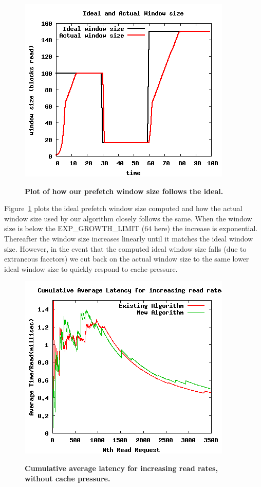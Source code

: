 \documentclass[twocolumn,10pt]{article}
\begin{document}
\begin{figure}[t!!]
\centering \resizebox{!}{2.8in}
{\includegraphics{window-size-pattern.png}}
\caption{\small \bf Plot of how our prefetch window size follows the ideal.}
\label{fig:window-size-pattern}
\end{figure}

Figure~\ref{fig:window-size-pattern} plots the ideal prefetch window size computed and how the actual window size used by our algorithm closely follows the same. When the window size is below the EXP\_GROWTH\_LIMIT (64 here) the increase is exponential. Thereafter the window size increases linearly until it matches the ideal window size. However, in the event that the computed ideal window size falls (due to extraneous facctors) we cut back on the actual window size to the same lower ideal window size to quickly respond to cache-pressure.

\begin{figure}[t!!]
\centering \resizebox{!}{2.8in}
{\includegraphics{file-read-rates.png}}
\caption{\small \bf Cumulative average latency for increasing read rates, without cache pressure.}
\label{fig:file-read-rates}
\end{figure}
\end{document}
